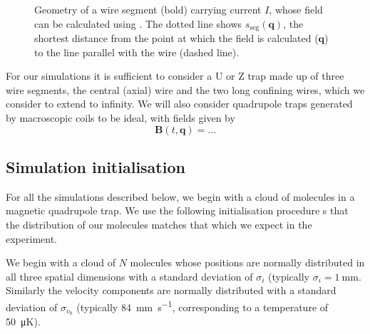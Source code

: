 \begin{figure}[h]
\centering
  \caption{Geometry of a wire segment (bold) carrying current $I$, whose field
  can be calculated using . The dotted line
  shows $s_\text{seg}(\mathbf{q})$, the shortest distance from the point at
  which the field is calculated ($\mathbf{q}$) to the line parallel with the
  wire (dashed line).
  }
  \label{design:fig:wiresegment}
\end{figure}

For our simulations it is sufficient to consider a U or Z trap made up of three
wire segments, the central (axial) wire and the two long confining wires, which
we consider to extend to infinity. We will also consider quadrupole traps
generated by macroscopic coils to be ideal, with fields given by~\cite{}
%
\begin{equation}
  \mathbf{B}(t, \mathbf{q}) =...
\end{equation}

\subsection{Simulation initialisation}

For all the simulations described below, we begin with a cloud of molecules in
a magnetic quadrupole trap. We use the following initialisation procedure s
that the distribution of our molecules matches that which we expect in the
experiment. 

We begin with a cloud of $N$ molecules whose positions are normally distributed
in all three spatial dimensions with a standard deviation of $\sigma_i$
(typically $\sigma_i = \SI{1}{\milli\meter}$. Similarly the velocity components
are normally distributed with a standard deviation of $\sigma_{v_0}$ (typically
\SI{84}{\milli\meter\per\second}, corresponding to a temperature of
\SI{50}{\micro\kelvin}). 

